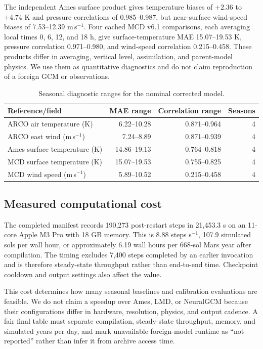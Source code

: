 \documentclass{article}
\begin{document}
The independent Ames surface product gives temperature biases of
\(+2.36\) to \(+4.74\) K and pressure correlations of
0.985--0.987, but near-surface wind-speed biases of 7.53--12.39 m\,s\(^{-1}\).
Four cached MCD v6.1 comparisons, each averaging local times 0, 6, 12, and
18 h, give surface-temperature MAE 15.07--19.53 K, pressure correlation
0.971--0.980, and wind-speed correlation 0.215--0.458. These products differ
in averaging, vertical level, assimilation, and parent-model physics. We use
them as quantitative diagnostics and do not claim reproduction of a foreign
GCM or observations.

\begin{table}[t]\centering\small
\caption{Seasonal diagnostic ranges for the nominal corrected model.}
\label{tab:seasonal-references}
\begin{tabular}{lrrr}\toprule
Reference/field & MAE range & Correlation range & Seasons\\\midrule
ARCO air temperature (K) & 6.22--10.28 & 0.871--0.964 & 4\\
ARCO east wind (m\,s\(^{-1}\)) & 7.24--8.89 & 0.871--0.939 & 4\\
Ames surface temperature (K) & 14.86--19.13 & 0.764--0.818 & 4\\
MCD surface temperature (K) & 15.07--19.53 & 0.755--0.825 & 4\\
MCD wind speed (m\,s\(^{-1}\)) & 5.89--10.52 & 0.215--0.458 & 4\\\bottomrule
\end{tabular}
\end{table}

\subsection{Measured computational cost}
The completed manifest records 190,273 post-restart steps in 21,453.3 s on an
11-core Apple M3 Pro with 18 GB memory. This is 8.88 steps s\(^{-1}\), 107.9
simulated sols per wall hour, or approximately 6.19 wall hours per 668-sol Mars
year after compilation. The timing excludes 7,400 steps completed by an earlier
invocation and is therefore steady-state throughput rather than end-to-end time.
Checkpoint cooldown and output settings also affect the value.

This cost determines how many seasonal baselines and calibration evaluations are feasible.
We do not claim a speedup over Ames, LMD, or NeuralGCM because their configurations
differ in hardware, resolution, physics, and output cadence. A fair final table
must separate compilation, steady-state throughput, memory, and simulated years
per day, and mark unavailable foreign-model runtime as ``not reported'' rather
than infer it from archive access time.
\end{document}
